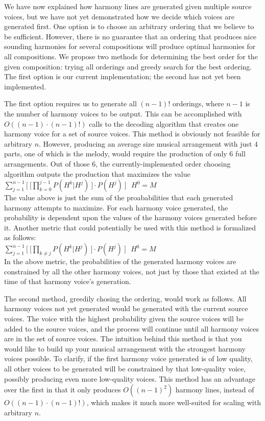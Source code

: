 \documentclass{sig-alternate}
\begin{document}
We have now explained how harmony lines are generated given multiple source voices, but we have not yet demonstrated how we decide which voices are generated first. One option is to choose an arbitrary ordering that we believe to be sufficient. However, there is no guarantee that an ordering that produces nice sounding harmonies for several compositions will produce optimal harmonies for all compositions. We propose two methods for determining the best order for the given composition: trying all orderings and greedy search for the best ordering. The first option is our current implementation; the second has not yet been implemented.

The first option requires us to generate all $(n - 1)!$ orderings, where $n - 1$ is the number of harmony voices to be output. This can be accomplished with $O((n - 1) \cdot (n - 1)!)$ calls to the decoding algorithm that creates one harmony voice for a set of source voices. This method is obviously not feasible for arbitrary $n$. However, producing an average size musical arrangement with just $4$ parts, one of which is the melody, would require the production of only $6$ full arrangements. Out of those $6$, the currently-implemented order choosing algorithm outputs the production that maximizes the value\\

$\sum_{j = 1}^{n - 1} \lbrack\ \lbrack\prod_{k = 0}^{j - 1} P(H^{k} | H^{j})\ \rbrack \cdot P(H^{j})\ \rbrack\ \ \ H^{0} = M$\\

The value above is just the sum of the proababilities that each generated harmony attempts to maximize. For each harmony voice generated, the probability is dependent upon the values of the harmony voices generated before it. Another metric that could potentially be used with this method is formalized as follows: \\

$\sum_{j = 1}^{n - 1} \lbrack\ \lbrack\prod_{k \neq j} P(H^{k} | H^{j})\ \rbrack \cdot P(H^{j})\ \rbrack\ \ \ H^{0} = M$\\

In the above metric, the probabilities of the generated harmony voices are constrained by all the other harmony voices, not just by those that existed at the time of that harmony voice's generation. 

The second method, greedily chosing the ordering, would work as follows. All harmony voices not yet generated would be generated with the current source voices. The voice with the highest probability given the source voices will be added to the source voices, and the process will continue until all harmony voices are in the set of source voices. The intuition behind this method is that you would like to build up your musical arrangement with the strongest harmony voices possible. To clarify, if the first harmony voice generated is of low quality, all other voices to be generated will be constrained by that low-quality voice, possibly producing even more low-quality voices. This method has an advantage over the first in that it only produces $O((n-1)^{2})$ harmony lines, instead of $O((n -1)\cdot(n-1)!)$, which makes it much more well-suited for scaling with arbitrary $n$.
\end{document}
